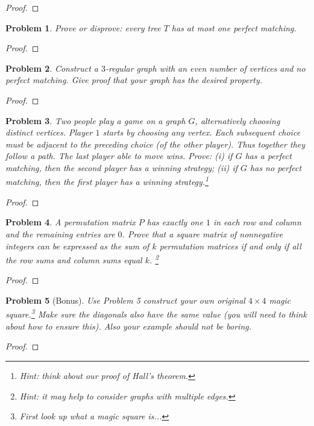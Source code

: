 \documentclass[11pt]{article}
\newtheorem{problem}{Problem}
\begin{document}
\begin{proof}

\end{proof}



\begin{problem}
Prove or disprove: every tree $T$ has at most one perfect matching. 
\end{problem}

\begin{proof}

\end{proof}


\begin{problem}
Construct a $3$-regular graph with an even number of vertices and no perfect matching. Give proof that your graph has the desired property. 
\end{problem}

\begin{proof}

\end{proof}

\begin{problem}
Two people play a game on a graph $G$, alternatively choosing distinct vertices. Player $1$ starts by choosing any vertex. Each subsequent choice must be adjacent to the preceding choice (of the other player). Thus together they follow a path. The last player able to move wins. Prove: (i) if $G$ has a perfect matching, then the second player has a winning strategy; (ii) if $G$ has no perfect matching, then the first player has a winning strategy.\footnote{Hint: think about our proof of Hall's theorem.} 
\end{problem}

\begin{proof}

\end{proof}

\begin{problem}
A permutation matrix $P$ has exactly one $1$ in each row and column and the remaining entries are $0$.  Prove that a square matrix of nonnegative integers can be expressed as the sum of $k$ permutation matrices if and only if all the row sums and column sums equal $k$. \footnote{Hint: it may help to consider graphs with multiple edges. }
\end{problem}

\begin{proof}

\end{proof}

\begin{problem}[Bonus] Use Problem 5 construct your own original $4\times 4$ magic square.\footnote{First look up what a magic square is...} Make sure the diagonals also have the same value (you will need to think about how to ensure this). Also your example should not be boring.
\end{problem}

\begin{proof}

\end{proof}
\end{document}
